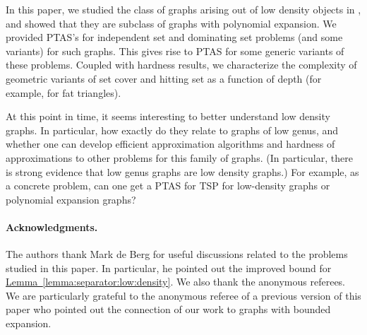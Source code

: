 \documentclass[12pt]{article}
\newcommand{\Term}[1]{\textsf{#1}}
\theoremstyle{remark}\theoremheaderfont{\sf}\theorembodyfont{\upshape}
\numberwithin{figure}{section}\numberwithin{table}{section}\numberwithin{equation}{section}
\newcommand{\HLink}[2]{\hyperref[#2]{#1~\ref*{#2}}}
\newcommand{\lemref}[1]{\HLink{Lemma}{lemma:#1}}
\newcommand{\PTAS}{\Term{PTAS}\xspace}
\newcommand{\si}[1]{#1}
\begin{document}
In this paper, we studied the class of graphs arising out of low
density objects in , and showed that they are subclass of
graphs with polynomial expansion. We provided \PTAS's for independent
set and dominating set problems (and some variants) for such
graphs. This gives rise to \PTAS for some generic variants of these
problems. Coupled with hardness results, we characterize the
complexity of geometric variants of set cover and hitting set as a
function of depth (for example, for fat triangles).

At this point in time, it seems interesting to better understand low
density graphs. In particular, how exactly do they relate to graphs of
low genus, and whether one can develop efficient approximation
algorithms and hardness of approximations to other problems for this
family of graphs. (In particular, there is strong evidence that low
genus graphs are low density graphs.) For example, as a concrete
problem, can one get a \PTAS for TSP for low-density graphs or
polynomial expansion graphs?

\paragraph{Acknowledgments.}

The authors thank Mark \si{de} Berg for useful discussions related to
the problems studied in this paper. In particular, he pointed out the
improved bound for \lemref{separator:low:density}. We also thank the
anonymous referees. We are particularly grateful to the anonymous
referee of a previous version of this paper who pointed out the
connection of our work to graphs with bounded expansion.

\hypersetup{allcolors=black}
\end{document}
